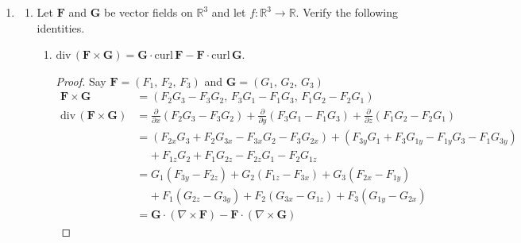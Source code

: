 \documentclass{article}
\newcommand{\parti}[1]{\frac{\partial}{\partial #1}}
\newcommand{\divt}{\text{div} \,}
\begin{document}
\begin{enumerate}
    \newpage
    \item 
    \begin{enumerate}
        \item Let $\boldsymbol F$ and $\boldsymbol G$ be vector fields on 
        $\mathbb{R}^3$ and let $f : \mathbb{R}^3 \rightarrow \mathbb{R}$.
        Verify the following identities.
        \begin{enumerate}[label=(\roman*)]
            \item $\divt (\boldsymbol F \times \boldsymbol G) 
            = \boldsymbol G \cdot \text{curl} \, \boldsymbol F 
            - \boldsymbol F \cdot \text{curl} \, \boldsymbol G.$

            \begin{proof}
            Say $\boldsymbol F = (F_1,\, F_2,\, F_3)$ and 
            $\boldsymbol G = (G_1,\, G_2,\, G_3)$
            \begin{align*}
                \boldsymbol F \times \boldsymbol G 
                &= (F_2G_3 - F_3G_2,\, F_3G_1 - F_1G_3,\, F_1G_2 - F_2G_1) \\
                \divt ( \boldsymbol F \times \boldsymbol G)
                &= \parti{x}(F_2G_3 - F_3G_2) + \parti{y}(F_3G_1 - F_1G_3)
                + \parti{z}(F_1G_2 - F_2G_1) \\
                &= (F_{2x}G_3 + F_{2}G_{3x} - F_{3x}G_2- F_3G_{2x}) 
                + (F_{3y}G_1 + F_{3}G_{1y} - F_{1y}G_3- F_1G_{3y}) \\
                &\; \; \; \; + F_{1z}G_2 + F_1G_{2z} - F_{2z}G_1 - F_2G_{1z} \\
                &= G_1 (F_{3y} - F_{2z}) + G_2 (F_{1z} - F_{3x}) 
                + G_3 (F_{2x} - F_{1y}) \\
                &\; \; \; \; + F_1 (G_{2z} - G_{3y}) + F_2 (G_{3x} - G_{1z}) 
                + F_3 (G_{1y} - G_{2x}) \\
                &= \boldsymbol G \cdot (\nabla \times \boldsymbol F)
                - \boldsymbol F \cdot (\nabla \times \boldsymbol G)
            \end{align*} 
            \end{proof}


\end{enumerate}
\end{enumerate}
\end{enumerate}
\end{document}
